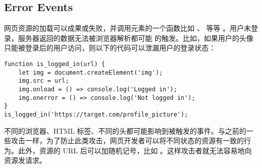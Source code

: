 \subsection{Error Events}

网页资源的加载可以成果或失败，并调用元素的一个函数比如 、 等等 \cite{ee}。用户未登录，服务器返回的数据无法被浏览器解析都可能  的触发。比如，如果用户的头像  只能被登录后的用户访问，则以下的代码可以泄漏用户的登录状态：

\begin{lstlisting}
function is_logged_in(url) {
    let img = document.createElement('img');
    img.src = url;
    img.onload = () => console.log('Logged in');
    img.onerror = () => console.log('Not logged in');
}
is_logged_in('https://target.com/profile_picture');

\end{lstlisting}

不同的浏览器、HTML 标签、不同的头都可能影响到被触发的事件。与之前的一些攻击一样，为了防止此类攻击，网页开发者可以将不同状态的资源有一致的行为。此外，资源的 URL 后可以加随机记号，比如 。这样攻击者就无法容易地向资源发请求。